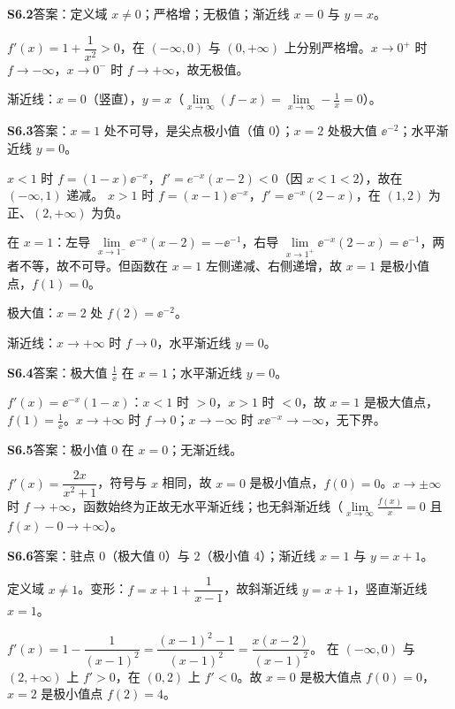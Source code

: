 \medskip
\noindent\textbf{S6.2}\quad 答案：定义域 $x\neq0$；严格增；无极值；渐近线 $x=0$ 与 $y=x$。

$f'(x)=1+\dfrac{1}{x^{2}}>0$，在 $(-\infty,0)$ 与 $(0,+\infty)$ 上分别严格增。$x\to0^{+}$ 时 $f\to-\infty$，$x\to0^{-}$ 时 $f\to+\infty$，故无极值。

渐近线：$x=0$（竖直），$y=x$（$\lim\limits_{x\to\infty}(f-x)=\lim\limits_{x\to\infty}-\frac1x=0$）。

\medskip
\noindent\textbf{S6.3}\quad 答案：$x=1$ 处不可导，是尖点极小值（值 $0$）；$x=2$ 处极大值 $\ee^{-2}$；水平渐近线 $y=0$。

$x<1$ 时 $f=(1-x)\ee^{-x}$，$f'=e^{-x}(x-2)<0$（因 $x<1<2$），故在 $(-\infty,1)$ 递减。
$x>1$ 时 $f=(x-1)\ee^{-x}$，$f'=\ee^{-x}(2-x)$，在 $(1,2)$ 为正、$(2,+\infty)$ 为负。

在 $x=1$：左导 $\lim\limits_{x\to1^-}\ee^{-x}(x-2)=-\ee^{-1}$，右导 $\lim\limits_{x\to1^+}\ee^{-x}(2-x)=\ee^{-1}$，两者不等，故不可导。但函数在 $x=1$ 左侧递减、右侧递增，故 $x=1$ 是极小值点，$f(1)=0$。

极大值：$x=2$ 处 $f(2)=\ee^{-2}$。

渐近线：$x\to+\infty$ 时 $f\to0$，水平渐近线 $y=0$。

\medskip
\noindent\textbf{S6.4}\quad 答案：极大值 $\frac1\ee$ 在 $x=1$；水平渐近线 $y=0$。

$f'(x)=\ee^{-x}(1-x)$：$x<1$ 时 $>0$，$x>1$ 时 $<0$，故 $x=1$ 是极大值点，$f(1)=\frac1\ee$。$x\to+\infty$ 时 $f\to0$；$x\to-\infty$ 时 $x\ee^{-x}\to-\infty$，无下界。

\medskip
\noindent\textbf{S6.5}\quad 答案：极小值 $0$ 在 $x=0$；无渐近线。

$f'(x)=\dfrac{2x}{x^{2}+1}$，符号与 $x$ 相同，故 $x=0$ 是极小值点，$f(0)=0$。$x\to\pm\infty$ 时 $f\to+\infty$，函数始终为正故无水平渐近线；也无斜渐近线（$\lim\limits_{x\to\infty}\frac{f(x)}{x}=0$ 且 $f(x)-0\to+\infty$）。

\medskip
\noindent\textbf{S6.6}\quad 答案：驻点 $0$（极大值 $0$）与 $2$（极小值 $4$）；渐近线 $x=1$ 与 $y=x+1$。

定义域 $x\neq1$。变形：$f=x+1+\dfrac{1}{x-1}$，故斜渐近线 $y=x+1$，竖直渐近线 $x=1$。

$f'(x)=1-\dfrac{1}{(x-1)^{2}}=\dfrac{(x-1)^{2}-1}{(x-1)^{2}}=\dfrac{x(x-2)}{(x-1)^{2}}$。
在 $(-\infty,0)$ 与 $(2,+\infty)$ 上 $f'>0$，在 $(0,2)$ 上 $f'<0$。故 $x=0$ 是极大值点 $f(0)=0$，$x=2$ 是极小值点 $f(2)=4$。

